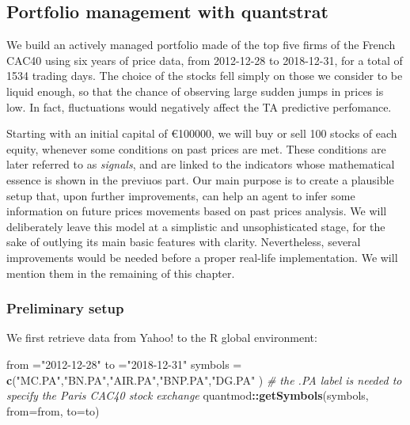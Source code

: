 \documentclass[
  11pt,
]{article}
\newenvironment{Shaded}{\begin{snugshade}}{\end{snugshade}}
\newcommand{\CommentTok}[1]{\textcolor[rgb]{0.56,0.35,0.01}{\textit{#1}}}
\newcommand{\DataTypeTok}[1]{\textcolor[rgb]{0.13,0.29,0.53}{#1}}
\newcommand{\KeywordTok}[1]{\textcolor[rgb]{0.13,0.29,0.53}{\textbf{#1}}}
\newcommand{\NormalTok}[1]{#1}
\newcommand{\OperatorTok}[1]{\textcolor[rgb]{0.81,0.36,0.00}{\textbf{#1}}}
\newcommand{\StringTok}[1]{\textcolor[rgb]{0.31,0.60,0.02}{#1}}
\begin{document}
\hypertarget{portfolio-management-with-quantstrat}{%
\subsection{Portfolio management with
quantstrat}\label{portfolio-management-with-quantstrat}}

We build an actively managed portfolio made of the top five firms of the
French CAC40 using six years of price data, from 2012-12-28 to
2018-12-31, for a total of 1534 trading days. The choice of the stocks
fell simply on those we consider to be liquid enough, so that the chance
of observing large sudden jumps in prices is low. In fact, fluctuations
would negatively affect the TA predictive perfomance.

Starting with an initial capital of €100000, we will buy or sell 100
stocks of each equity, whenever some conditions on past prices are met.
These conditions are later referred to as \emph{signals}, and are linked
to the indicators whose mathematical essence is shown in the previuos
part. Our main purpose is to create a plausible setup that, upon further
improvements, can help an agent to infer some information on future
prices movements based on past prices analysis. We will deliberately
leave this model at a simplistic and unsophisticated stage, for the sake
of outlying its main basic features with clarity. Nevertheless, several
improvements would be needed before a proper real-life implementation.
We will mention them in the remaining of this chapter.

\hypertarget{preliminary-setup}{%
\subsubsection{Preliminary setup}\label{preliminary-setup}}

We first retrieve data from Yahoo! to the R global environment:

\begin{Shaded}
\begin{Highlighting}[]
\NormalTok{from =}\StringTok{"2012-12-28"}
\NormalTok{to =}\StringTok{"2018-12-31"}
\NormalTok{symbols =}\StringTok{ }\KeywordTok{c}\NormalTok{(}\StringTok{"MC.PA"}\NormalTok{,}\StringTok{"BN.PA"}\NormalTok{,}\StringTok{"AIR.PA"}\NormalTok{,}\StringTok{"BNP.PA"}\NormalTok{,}\StringTok{"DG.PA"}\NormalTok{ )}
\CommentTok{# the .PA label is needed to specify the Paris CAC40 stock exchange}
\NormalTok{quantmod}\OperatorTok{::}\KeywordTok{getSymbols}\NormalTok{(symbols,}
                     \DataTypeTok{from=}\NormalTok{from, }\DataTypeTok{to=}\NormalTok{to)}
\end{Highlighting}
\end{Shaded}
\end{document}
